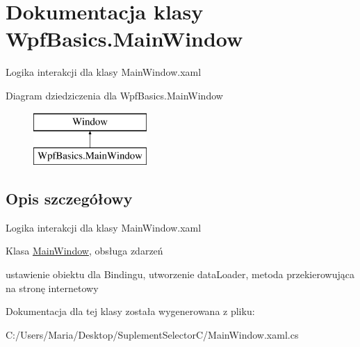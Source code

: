 \hypertarget{class_wpf_basics_1_1_main_window}{}\section{Dokumentacja klasy Wpf\+Basics.\+Main\+Window}
\label{class_wpf_basics_1_1_main_window}


Logika interakcji dla klasy Main\+Window.\+xaml  


Diagram dziedziczenia dla Wpf\+Basics.\+Main\+Window\begin{figure}[H]
\begin{center}
\leavevmode
\includegraphics[height=2.000000cm]{class_wpf_basics_1_1_main_window}
\end{center}
\end{figure}


\subsection{Opis szczegółowy}
Logika interakcji dla klasy Main\+Window.\+xaml 

Klasa \hyperlink{class_wpf_basics_1_1_main_window}{Main\+Window}, obsługa zdarzeń

ustawienie obiektu dla Bindingu, utworzenie data\+Loader, metoda przekierowująca na stronę internetowy 

Dokumentacja dla tej klasy została wygenerowana z pliku\+:\begin{DoxyCompactItemize}
\item 
C\+:/\+Users/\+Maria/\+Desktop/\+Suplement\+Selector\+C/Main\+Window.\+xaml.\+cs\end{DoxyCompactItemize}
